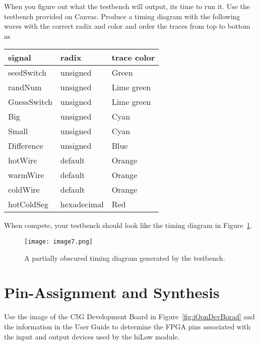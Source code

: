 When you figure out what the testbench will output, its time to run it.
Use the testbench provided on Canvas. Produce a timing diagram with the
following waves with the correct radix and color and order the
traces from top to bottom as

\begin{tabular}{p{4cm}p{4cm}p{4cm}}
    signal & radix & trace color \\ \hline
    seedSwitch  &  unsigned & Green  \\
    randNum  &  unsigned  & Lime green  \\
    GuessSwitch  &  unsigned  & Lime green  \\
    Big   & unsigned &  Cyan  \\
    Small  &  unsigned &  Cyan  \\
    Difference  &  unsigned &  Blue  \\
    hotWire  & default &  Orange  \\
    warmWire  & default &  Orange  \\
    coldWire  & default &  Orange  \\
    hotColdSeg  & hexadecimal &  Red  \\
\end{tabular}

When compete, your testbench should look like the timing diagram in
Figure~\ref{fig:guessTiming}.

\begin{figure}[ht]
    \texttt{[image:  image7.png]}
    \caption{A partially obscured timing diagram generated by the testbench.}
    \label{fig:guessTiming}
\end{figure}

\section{Pin-Assignment and Synthesis}

Use the image of the C5G Development Board in Figure~\ref{fig:iOonDevBorad} and the information
in the User Guide to determine the FPGA pins associated with the input
and output devices used by the hiLow module.

